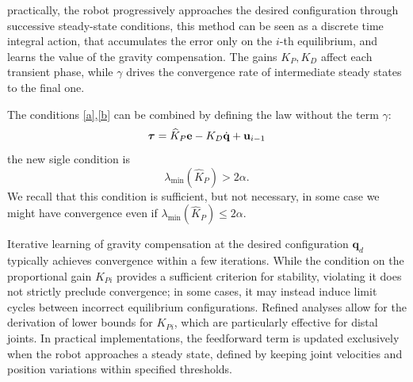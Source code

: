 \documentclass[10pt, a4paper]{report}
\newcommand{\q}{{\mathbf q}}
\begin{document}
practically, the robot progressively approaches the desired configuration
through successive steady-state conditions, this method can be seen as a discrete time integral action, that accumulates the error only on the $i$-th equilibrium, and learns the value of the gravity compensation. The gains $K_P,K_D$ affect each transient phase, while $\gamma$ drives the convergence rate of intermediate steady states
to the final one.\bigskip 

The conditions \eqref{a},\eqref{b} can be combined by defining the law without the term $\gamma$:\begin{equation}
    {\boldsymbol{\tau}}=\widehat K_P\mathbf e-K_D{\dot{\mathbf q}}+\mathbf u_{i-1}
\end{equation}
the new sigle condition is \begin{equation}
    \lambda_{\text{min}}(\widehat K_P)>2\alpha.
\end{equation}
We recall that this condition is sufficient, but not necessary, in some case we might have convergence even if $\lambda_{\text{min}}(\hat K_P)\le2\alpha$.

Iterative learning of gravity compensation at the desired configuration $\q_d$ typically achieves convergence within a few iterations. While the condition on the proportional gain $K_{Pi}$ provides a sufficient criterion for stability, violating it does not strictly preclude convergence; in some cases, it may instead induce limit cycles between incorrect equilibrium configurations. Refined analyses allow for the derivation of lower bounds for $K_{Pi}$, which are particularly effective for distal joints. In practical implementations, the feedforward term is updated exclusively when the robot approaches a steady state, defined by keeping joint velocities and position variations within specified thresholds.
\end{document}
